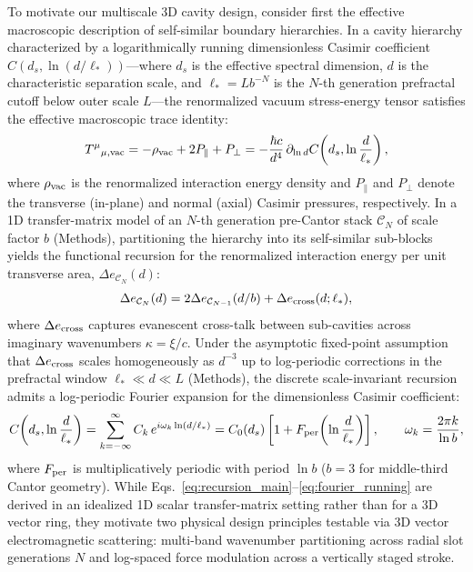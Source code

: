 \documentclass[pdflatex,sn-nature]{sn-jnl}
\begin{document}
To motivate our multiscale 3D cavity design, consider first the effective macroscopic description of self-similar boundary hierarchies\cite{gordon2026prd}. In a cavity hierarchy characterized by a logarithmically running dimensionless Casimir coefficient $C(d_s, \ln(d/\ell_*))$---where $d_s$ is the effective spectral dimension, $d$ is the characteristic separation scale, and $\ell_* = L b^{-N}$ is the $N$-th generation prefractal cutoff below outer scale $L$---the renormalized vacuum stress-energy tensor satisfies the effective macroscopic trace identity\cite{gordon2026prd}:
\begin{equation}
T^\mu{}_{\mu,\rm vac} = -\rho_{\rm vac} + 2P_\parallel + P_\perp = -\frac{\hbar c}{d^4} \,\partial_{\ln d}C\!\left(d_s, \ln\frac{d}{\ell_*}\right),
\label{eq:trace_running}
\end{equation}
where $\rho_{\rm vac}$ is the renormalized interaction energy density and $P_\parallel$ and $P_\perp$ denote the transverse (in-plane) and normal (axial) Casimir pressures, respectively. In a 1D transfer-matrix model of an $N$-th generation pre-Cantor stack $\mathcal{C}_N$ of scale factor $b$ (Methods), partitioning the hierarchy into its self-similar sub-blocks yields the functional recursion for the renormalized interaction energy per unit transverse area, $\Delta e_{\mathcal{C}_N}(d)$:
\begin{equation}
\Delta e_{\mathcal{C}_N}(d) = 2 \Delta e_{\mathcal{C}_{N-1}}(d/b) + \Delta e_{\rm cross}(d; \ell_*),
\label{eq:recursion_main}
\end{equation}
where $\Delta e_{\rm cross}$ captures evanescent cross-talk between sub-cavities across imaginary wavenumbers $\kappa = \xi/c$. Under the asymptotic fixed-point assumption that $\Delta e_{\rm cross}$ scales homogeneously as $d^{-3}$ up to log-periodic corrections in the prefractal window $\ell_* \ll d \ll L$ (Methods), the discrete scale-invariant recursion admits a log-periodic Fourier expansion for the dimensionless Casimir coefficient:
\begin{equation}
C\!\left(d_s, \ln\frac{d}{\ell_*}\right) = \sum_{k=-\infty}^{\infty} C_k \, e^{i \omega_k \ln(d/\ell_*)} = C_0(d_s) \left[ 1 + F_{\rm per}\!\left(\ln\frac{d}{\ell_*}\right) \right], \qquad \omega_k = \frac{2\pi k}{\ln b},
\label{eq:fourier_running}
\end{equation}
where $F_{\rm per}$ is multiplicatively periodic with period $\ln b$ ($b=3$ for middle-third Cantor geometry). While Eqs.~\eqref{eq:recursion_main}--\eqref{eq:fourier_running} are derived in an idealized 1D scalar transfer-matrix setting rather than for a 3D vector ring, they motivate two physical design principles testable via 3D vector electromagnetic scattering: multi-band wavenumber partitioning across radial slot generations $N$ and log-spaced force modulation across a vertically staged stroke.
\end{document}
